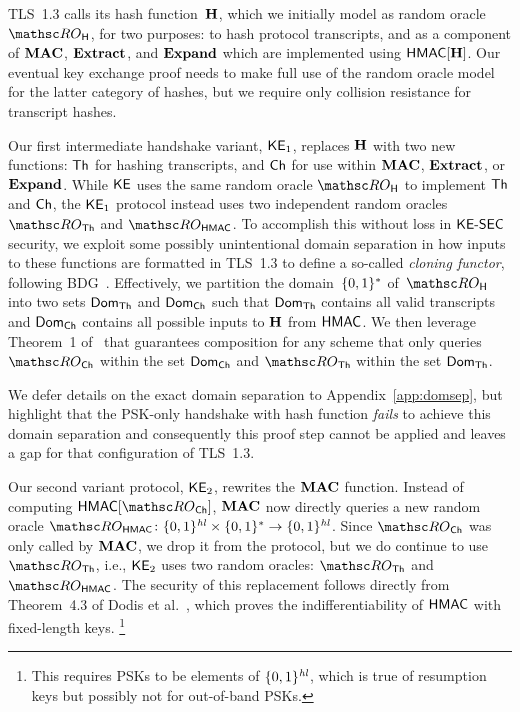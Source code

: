 \begin{description}
	\setlength{\itemsep}{0.5em}
	
	\item[From one random oracle to two.]
	TLS~1.3 calls its hash function~$\mathbf{H}$, which we initially model as random oracle~$\ROhash$, for two purposes:
	to hash protocol transcripts, and as a component of $\mathbf{MAC}$, $\mathbf{Extract}$, and $\mathbf{Expand}$ which are implemented using $\mathsf{HMAC}[\mathbf{H}]$.
	Our eventual key exchange proof needs to make full use of the random oracle model for the latter category of hashes, but we require only collision resistance for transcript hashes. 
	
	Our first intermediate handshake variant, $\mathsf{KE}_1$, replaces $\mathbf{H}$ with two new functions: $\mathsf{Th}$ for hashing transcripts, and $\mathsf{Ch}$ for use within $\mathbf{MAC}$, $\mathbf{Extract}$, or $\mathbf{Expand}$.
	While $\mathsf{KE}$ uses the same random oracle $\ROhash$ to implement $\mathsf{Th}$ and $\mathsf{Ch}$, the $\mathsf{KE}_1$ protocol instead uses two independent random oracles $\ROthash$ and $\ROhmac$.
	To accomplish this without loss in $\mathsf{KE{\text{\normalfont-}}SEC}$ security, we exploit some possibly unintentional domain separation in how inputs to these functions are formatted in TLS~1.3 to define a so-called \emph{cloning functor}, following BDG~\cite{EC:BelDavGun20}.
	Effectively, we partition the domain~$\{0,1\}^*$ of~$\ROhash$ into two sets $\mathsf{Dom}_{\mathsf{Th}}$ and $\mathsf{Dom}_{\mathsf{Ch}}$ such that $\mathsf{Dom}_{\mathsf{Th}}$ contains all valid transcripts and $\mathsf{Dom}_{\mathsf{Ch}}$ contains all possible inputs to $\mathbf{H}$ from $\mathsf{HMAC}$. 
	We then leverage Theorem~1 of~\cite{EC:BelDavGun20} that guarantees composition for any scheme that only queries $\ROchash$ within the set $\mathsf{Dom}_{\mathsf{Ch}}$ and $\ROthash$ within the set $\mathsf{Dom}_{\mathsf{Th}}$.
	
	We defer details on the exact domain separation to 
		Appendix~\ref{app:domsep},
	but highlight that the PSK-only handshake with hash function  \emph{fails} to achieve this domain separation
	and consequently this proof step cannot be applied and leaves a gap for that configuration of TLS~1.3. 
	
	
	\item[From SHA to HMAC.]

	Our second variant protocol, $\mathsf{KE}_2$, rewrites the $\mathbf{MAC}$ function. Instead of computing $\HMAC[\ROchash]$, $\mathbf{MAC}$ now directly queries a new random oracle $\ROhmac \colon\allowbreak \bits^{\hashlen} \times \bits^* \to \bits^{\hashlen}$.
	Since $\ROchash$ was only called by $\mathbf{MAC}$, we drop it from the protocol, but we do continue to use $\ROthash$,
	i.e., $\mathsf{KE}_2$ uses two random oracles: $\ROthash$ and $\ROhmac$.
	The security of this replacement follows directly from Theorem~4.3 of Dodis et al.~\cite{C:DRST12}, which proves the indifferentiability of $\mathsf{HMAC}$ with fixed-length keys.%
	\footnote{This requires PSKs to be elements of $\{0,1\}^{\mathit{hl}}$, which is true of resumption keys but possibly not for out-of-band PSKs.}


\end{description}
